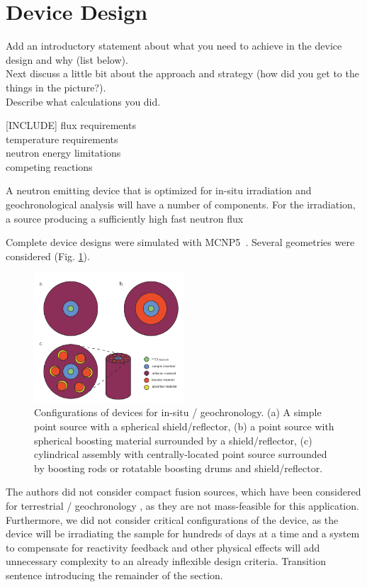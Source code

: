 \documentclass{mc2015}
\begin{document}
\section{Device Design}
\label{sec:design}

Add an introductory statement about what you need to achieve in the device design and why (list below). \\Next discuss a little bit about the approach and strategy (how did you get to the things in the picture?). \\ Describe what calculations you did.

[INCLUDE] flux requirements\\
temperature requirements\\
neutron energy limitations\\
competing reactions

A neutron emitting device that is optimized for in-situ irradiation and geochronological analysis will have a number of components. For the irradiation, a source producing a sufficiently high fast neutron flux

Complete device designs were simulated with MCNP5~\cite{brown_mcnp_2002}. Several geometries were considered (Fig. \ref{fig:geometries}). 

\begin{figure}[H]
  \centering
  \includegraphics[width=0.5\textwidth]{Geometries.png}
  \caption{Configurations of devices for in-situ / geochronology. (a) A simple point source with a spherical shield/reflector, (b) a point source with spherical boosting material surrounded by a shield/reflector, (c) cylindrical assembly with centrally-located point source surrounded by boosting rods or rotatable boosting drums and shield/reflector.}
  \label{fig:geometries}
\end{figure}

The authors did not consider compact fusion sources, which have been considered for terrestrial / geochronology \cite{renne_application_2005}, as they are not mass-feasible for this application. Furthermore, we did not consider critical configurations of the device, as the device will be irradiating the sample for hundreds of days at a time and a system to compensate for reactivity feedback and other physical effects will add unnecessary complexity to an already inflexible design criteria. Transition sentence introducing the remainder of the section.
\end{document}
